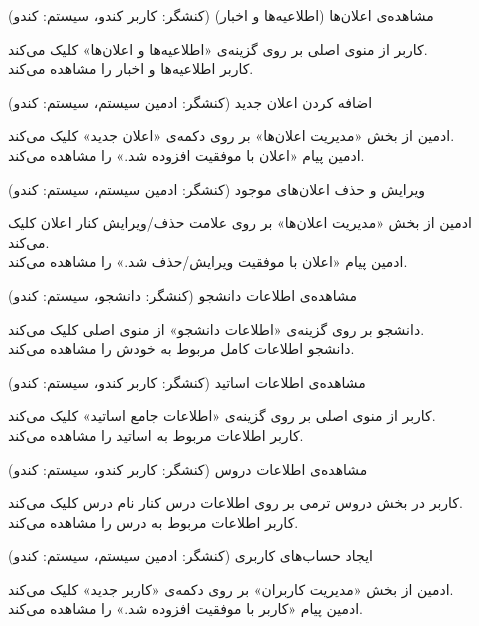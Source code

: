 \documentclass{report}
\begin{document}
\textbf{}
مشاهده‌ی اعلان‌ها (اطلاعیه‌ها و اخبار) (کنشگر: کاربر کندو، سیستم: کندو)
\begin{addmargin}[.84cm]{0cm}
کاربر از منوی اصلی بر روی گزینه‌ی «اطلاعیه‌ها و اعلان‌ها» کلیک می‌کند.\\
کاربر اطلاعیه‌ها و اخبار را مشاهده می‌کند.
\end{addmargin}

\textbf{}
اضافه کردن اعلان جدید (کنشگر: ادمین سیستم، سیستم: کندو)
\begin{addmargin}[.84cm]{0cm}
ادمین از بخش «مدیریت اعلان‌ها» بر روی دکمه‌ی «اعلان جدید» کلیک می‌کند.\\
ادمین پیام «اعلان با موفقیت افزوده شد.» را مشاهده می‌کند.
\end{addmargin}

\textbf{}
ویرایش و حذف اعلان‌های موجود (کنشگر: ادمین سیستم، سیستم: کندو)
\begin{addmargin}[.84cm]{0cm}
ادمین از بخش «مدیریت اعلان‌ها» بر روی علامت حذف/ویرایش کنار اعلان کلیک می‌کند.\\
ادمین پیام «اعلان با موفقیت ویرایش/حذف شد.» را مشاهده می‌کند.
\end{addmargin}

\textbf{}
مشاهده‌ی اطلاعات دانشجو (کنشگر: دانشجو، سیستم: کندو)\begin{addmargin}[.84cm]{0cm}
دانشجو بر روی گزینه‌ی «اطلاعات دانشجو» از منوی اصلی کلیک می‌کند.\\
دانشجو اطلاعات کامل مربوط به خودش را مشاهده می‌کند.
\end{addmargin}

\textbf{}
مشاهده‌ی اطلاعات اساتید (کنشگر: کاربر کندو، سیستم: کندو)\begin{addmargin}[.84cm]{0cm}
کاربر از منوی اصلی بر روی گزینه‌ی «اطلاعات جامع اساتید» کلیک می‌کند.\\
کاربر اطلاعات مربوط به اساتید را مشاهده می‌کند.
\end{addmargin}
\clearpage
\textbf{}
مشاهده‌ی اطلاعات دروس (کنشگر: کاربر کندو، سیستم: کندو)\begin{addmargin}[.84cm]{0cm}
کاربر در بخش دروس ترمی بر روی اطلاعات درس کنار نام درس کلیک می‌کند.\\
کاربر اطلاعات مربوط به درس را مشاهده می‌کند.
\end{addmargin}

\textbf{}
ایجاد حساب‌های کاربری (کنشگر: ادمین سیستم، سیستم: کندو)\begin{addmargin}[.84cm]{0cm}
ادمین از بخش «مدیریت کاربران» بر روی دکمه‌ی «کاربر جدید» کلیک می‌کند.\\
ادمین پیام «کاربر با موفقیت افزوده شد.» را مشاهده می‌کند.
\end{addmargin}
\end{document}
